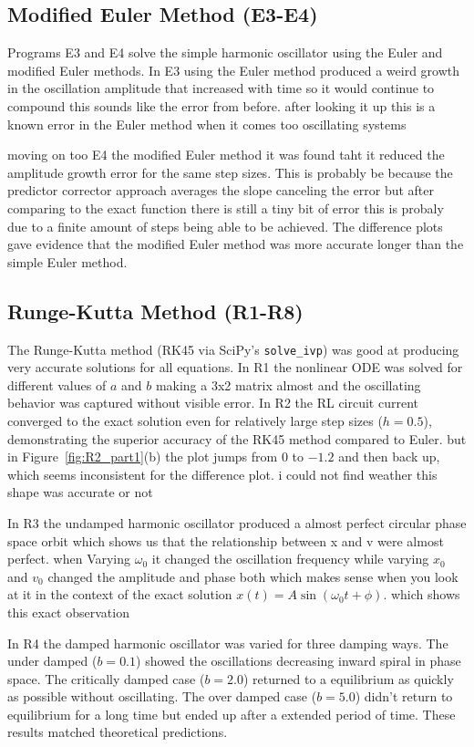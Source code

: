 \documentclass[12pt,a4paper]{article}
\begin{document}
	\subsection*{Modified Euler Method (E3-E4)}
	Programs E3 and E4 solve the simple harmonic oscillator using the Euler and modified Euler methods. In E3 using the Euler method produced a weird growth in the oscillation amplitude that increased with time so it would continue to compound this sounds like the error from before. after looking it up this is a known error in the Euler method when it comes too oscillating systems
	
	moving on too E4 the modified Euler method it was found taht it reduced the amplitude growth error for the same step sizes. This is probably be because the predictor corrector approach averages the slope canceling the error but after comparing to the exact function there is still a tiny bit of error this is probaly due to a finite amount of steps being able to be achieved.
	The difference plots gave evidence that the modified Euler method was more accurate longer than the simple Euler method.
	
	\subsection*{Runge-Kutta Method (R1-R8)}
	The Runge-Kutta method (RK45 via SciPy's \texttt{solve\_ivp}) was good at producing very accurate solutions for all equations. In R1  the nonlinear ODE was solved for different values of \(a\) and \(b\) making a 3x2 matrix almost and the oscillating behavior was captured without visible error.
	In R2 the RL circuit current converged to the exact solution even for relatively large step sizes (\(h = 0.5\)), demonstrating the superior accuracy of the RK45 method compared to Euler.
	but in Figure~\ref{fig:R2_part1}(b) the plot jumps from \(0\) to \(-1.2\) and then back up, which seems inconsistent for the difference plot. i could not find weather this shape was accurate or not
	
	In R3 the undamped harmonic oscillator produced a almost perfect circular phase space orbit which shows us that the relationship between x and v were almost perfect. when Varying \(\omega_0\) it changed the oscillation frequency while varying \(x_0\) and \(v_0\) changed the amplitude and phase both which makes sense when you look at it in the context of the exact solution \(x(t) = A\sin(\omega_0 t + \phi)\). which shows this exact observation
	
	In R4 the damped harmonic oscillator was varied for three damping ways. The under damped (\(b = 0.1\)) showed the oscillations decreasing inward spiral in phase space. The critically damped case (\(b = 2.0\)) returned to a equilibrium as quickly as possible without oscillating.
	The over damped case (\(b = 5.0\)) didn't return to equilibrium for a long time but ended up after a extended period of time. These results matched theoretical predictions.
	
\end{document}
